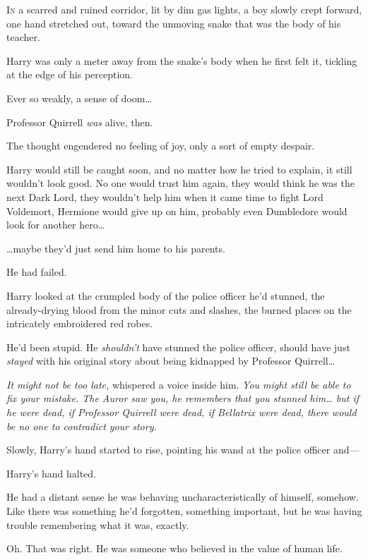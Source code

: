 
\lettrine{I}{n} a scarred and 
ruined corridor, lit by dim gas lights, a boy slowly crept forward, one hand 
stretched out, toward the unmoving snake that was the body of his teacher.

Harry was only a meter away from the snake's body when he first felt it, 
tickling at the edge of his perception.

Ever so weakly, a sense of doom{\ldots}

Professor Quirrell \emph{was} alive, then.

The thought engendered no feeling of joy, only a sort of empty despair.

Harry would still be caught soon, and no matter how he tried to explain, it 
still wouldn't look good. No one would trust him again, they would think he was 
the next Dark Lord, they wouldn't help him when it came time to fight Lord 
Voldemort, Hermione would give up on him, probably even Dumbledore would look 
for another hero{\ldots}

{\ldots}maybe they'd just send him home to his parents.

He had failed.

Harry looked at the crumpled body of the police officer he'd stunned, the 
already-drying blood from the minor cuts and slashes, the burned places on the 
intricately embroidered red robes.

He'd been stupid. He \emph{shouldn't} have stunned the police officer, should 
have just \emph{stayed} with his original story about being kidnapped by 
Professor Quirrell{\ldots}

\emph{It might not be too late,} whispered a voice inside him. \emph{You might 
still be able to fix your mistake. The Auror saw you, he remembers that you 
stunned him{\ldots} but if he were dead, if Professor Quirrell were dead, if 
Bellatrix were dead, there would be no one to contradict your story.}

Slowly, Harry's hand started to rise, pointing his wand at the police officer 
and---

Harry's hand halted.

He had a distant sense he was behaving uncharacteristically of himself, 
somehow. Like there was something he'd forgotten, something important, but he 
was having trouble remembering what it was, exactly.

Oh. That was right. He was someone who believed in the value of human life.

